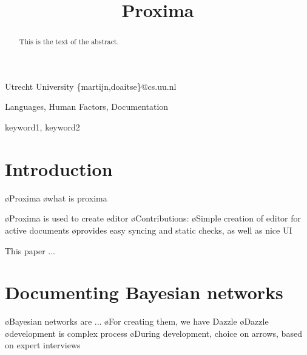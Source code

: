 \documentclass[preprint,natbib]{sigplanconf}
\begin{document}
\copyrightdata{[to be supplied]} 

\preprintfooter{\version}   %

\title{Proxima}

           {Utrecht University}
           {\{martijn,doaitse\}@cs.uu.nl}

\maketitle

\begin{abstract}
This is the text of the abstract.
\end{abstract}


\terms
Languages, Human Factors, Documentation

\keywords
keyword1, keyword2




\section{Introduction}


\bl
\o Proxima
\o what is proxima
\el

\bl
\o Proxima is used to create editor
\el
\bl
\o Contributions:
\o Simple creation of editor for active documents
\o provides easy syncing and static checks, as well as nice UI
\el

This paper ...


\section{Documenting Bayesian networks}

\bl
\o Bayesian networks are ...
\o For creating them, we have Dazzle
\o Dazzle~\cite{schrage05Dazzle}
\o development is complex process
\o During development, choice on arrows, based on expert interviews
\end{document}
